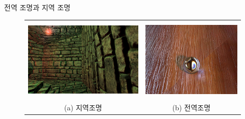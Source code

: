 \documentclass{beamer}
\begin{document}
\begin{frame}{전역 조명과 지역 조명}

\begin{figure}
	\begin{tabular}{cc}
	\includegraphics[height=4cm]{OGL_intro/realtimeEx.png} &    \includegraphics[height=4cm]{OGL_intro/offlineEx.jpg} \\
	(a) 지역조명 & (b) 전역조명
	\end{tabular}
\end{figure}

\end{frame}
\end{document}
